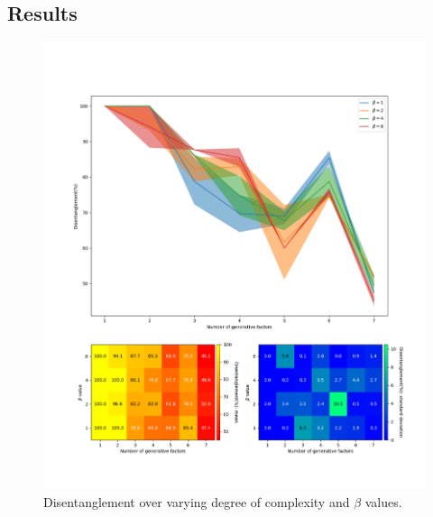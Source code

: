         \subsection{Results}
            \begin{figure}[H]
                \centering
                \includegraphics[width=1\textwidth]{imgs/complexity_last.png}
                \caption{Disentanglement over varying degree of complexity and $\beta$ values. }
                \label{fig:complexity_last}
            \end{figure}
            
            
            
            
